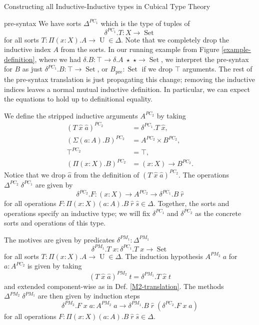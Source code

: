 \documentclass[acmsmall,review]{acmart}\settopmatter{printfolios=true,printccs=false,printacmref=false}
\DeclareMathOperator{\USet}{Set}
\DeclareMathOperator{\UU}{U}
\newcommand{\pre}[1]{{#1}_\text{pre}}
\begin{document}
\begin{section}{Constructing all Inductive-Inductive types in Cubical Type Theory}
\begin{subsection}{pre-syntax}
We have sorts $\Delta^{PC_1}$ which is the type of tuples of \[\delta^{PC_1}.T : X \to \USet\] for all sorts $T : \Pi(x : X).A\to\UU \in\Delta$. Note that we completely drop the inductive index $A$ from the sorts. In our running example from Figure \ref{example-definition}, where we had $\delta.B : \top \to \delta.A\;\star\;\star \to \USet$, we interpret the pre-syntax for $B$ as just $\delta^{PC_1}.B : \top \to \USet$, or $\pre{B} : \USet$ if we drop $\top$ arguments. The rest of the pre-syntax translation is just propagating this change; removing the inductive indices leaves a normal mutual inductive definition. In particular, we can expect the equations to hold up to definitional equality.

We define the stripped inductive arguments $A^{PC_2}$ by taking
\begin{align*}
(T\;\hat{x}\;\hat{a})^{PC_2} &= \delta^{PC_1}.T\;\hat{x},\\
(\Sigma(a : A).B)^{PC_2} &= A^{PC_2}\times B^{PC_2},\\
\top^{PC_2} &= \top,\\
(\Pi(x : X).B)^{PC_2} &= (x : X) \to B^{PC_2}.
\end{align*} Notice that we drop $\hat{a}$ from the definition of $(T\;\hat{x}\;\hat{a})^{PC_2}$.
The operations $\Delta^{PC_2}\;\delta^{PC_1}$ are given by \[\delta^{PC_2}.F : (x : X) \to A^{PC_2} \to \delta^{PC_1}.B\;\hat{r}\] for all operations $F : \Pi(x : X)(a : A).B\;\hat{r}\;\hat{s} \in \Delta$. Together, the sorts and operations specify an inductive type; we will fix $\delta^{PC_1}$ and $\delta^{PC_2}$ as the concrete sorts and operations of this type.

The motives are given by predicates $\delta^{PM_1} : \Delta^{PM_1}$ \[\delta^{PM_1}.T\;x : \delta^{PC_1}.T\;x\to \USet\] for all sorts $T : \Pi(x : X).A\to\UU \in\Delta$. The induction hypothesis $A^{PM_2}\;a$ for $a : A^{PC_2}$ is given by taking \[(T\;\hat{x}\;\hat{a})^{PM_2}\;t = \delta^{PM_1}.T\;\hat{x}\;t\] and extended component-wise as in Def. \ref{M2-translation}. The methods $\Delta^{PM_2}\;\delta^{PM_1}$ are then given by induction steps \[\delta^{PM_2}.F\;x\;a : A^{PM_2}\;a \to \delta^{PM_1}.B\;\hat{r}\;(\delta^{PC_2}.F\;x\;a)\] for all operations $F : \Pi(x : X)(a : A).B\;\hat{r}\;\hat{s} \in \Delta$.


\end{subsection}
\end{section}
\end{document}
